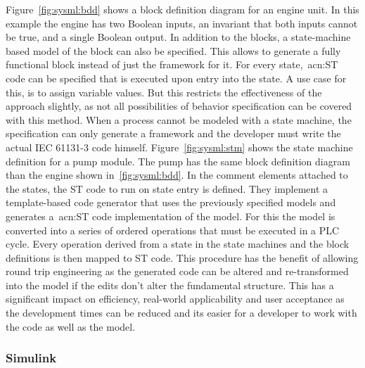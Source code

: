 Figure~\ref{fig:sysml:bdd} shows a block definition diagram for an engine unit.
In this example the engine has two Boolean inputs, an invariant that both inputs cannot be true, and a single Boolean output.
In addition to the blocks, a state-machine based model of the block can also be specified.
This allows to generate a fully functional block instead of just the framework for it.
For every state,~\acrshort{acn:ST} code can be specified that is executed upon entry into the state.
A use case for this, is to assign variable values.
But this restricts the effectiveness of the approach slightly, as not all possibilities of behavior specification can be covered with this method.
When a process cannot be modeled with a state machine, the specification can only generate a framework and the developer must write the actual IEC 61131-3 code himself.
Figure~\ref{fig:sysml:stm} shows the state machine definition for a pump module.
The pump has the same block definition diagram than the engine shown in~\ref{fig:sysml:bdd}.
In the comment elements attached to the states, the ST code to run on state entry is defined.
They implement a template-based code generator that uses the previously specified models and generates a~\acrshort{acn:ST} code implementation of the model.
For this the model is converted into a series of ordered operations that must be executed in a PLC cycle.
Every operation derived from a state in the state machines and the block definitions is then mapped to ST code.
This procedure has the benefit of allowing round trip engineering as the generated code can be altered and re-transformed into the model if the edits don't alter the fundamental structure.
This has a significant impact on efficiency, real-world applicability and user acceptance as the development times can be reduced and its easier for a developer to work with the code as well as the model.

\subsubsection{Simulink}
\label{sec:sub:simulink}


